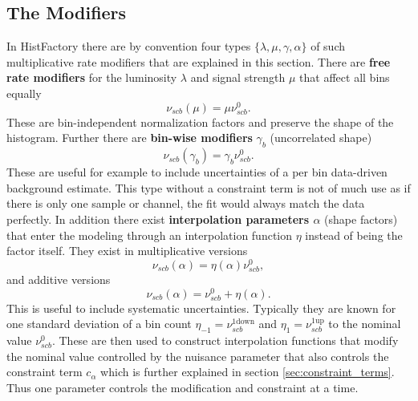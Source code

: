\subsection{The Modifiers}\label{sec:modifiers}
In HistFactory there are by convention four types $\{\lambda,\mu,\gamma,\alpha\}$ of such multiplicative rate modifiers that are explained in this section. There are \textbf{free rate modifiers} for the luminosity $\lambda$ and signal strength $\mu$ that affect all bins equally
\begin{equation}
    \nu_{scb}(\mu)=\mu \nu_{scb}^0.
\end{equation}
These are bin-independent normalization factors and preserve the shape of the histogram.
Further there are \textbf{bin-wise modifiers} $\gamma_b$ (uncorrelated shape)
\begin{equation}
    \nu_{scb}(\gamma_b)=\gamma_b \nu_{scb}^0.
\end{equation}
These are useful for example to include uncertainties of a per bin data-driven background estimate. This type without a constraint term is not of much use as if there is only one sample or channel, the fit would always match the data perfectly.
In addition there exist \textbf{interpolation parameters $\alpha$} (shape factors) that enter the modeling through an interpolation function $\eta$ instead of being the factor itself. They exist in multiplicative versions
\begin{equation}
    \nu_{scb}(\alpha)=\eta(\alpha) \nu_{scb}^0,
\end{equation}
and additive versions
\begin{equation}
    \nu_{scb}(\alpha)=\nu_{scb}^0 + \eta(\alpha).
\end{equation}
This is useful to include systematic uncertainties. Typically they are known for one standard deviation of a bin count $\eta_{-1}=\nu_{scb}^\mathrm{1down}$ and $\eta_{1}=\nu_{scb}^\mathrm{1up}$ to the nominal value $\nu_{scb}^0$. These are then used to construct interpolation functions that modify the nominal value controlled by the nuisance parameter that also controls the constraint term $c_\alpha$ which is further explained in section \ref{sec:constraint_terms}. Thus one parameter controls the modification and constraint at a time.

